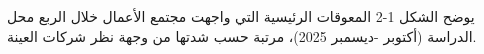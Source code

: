 يوضح الشكل 1-2 المعوقات الرئيسية التي واجهت مجتمع الأعمال خلال الربع محل الدراسة (أكتوبر -ديسمبر 2025)، مرتبة حسب شدتها من وجهة نظر شركات العينة.